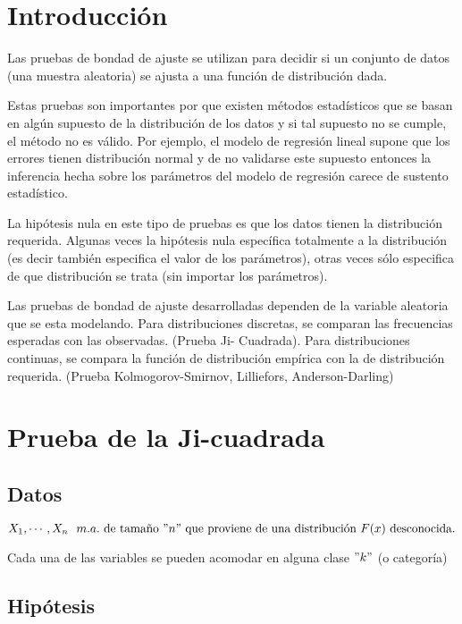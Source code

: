 \documentclass[
  a4paper,
  oneside,
  openany]{book}
\begin{document}
\hypertarget{introducciuxf3n-4}{%
\chapter*{Introducción}\label{introducciuxf3n-4}}


Las pruebas de bondad de ajuste se utilizan para decidir si un conjunto de datos (una muestra aleatoria) se ajusta a una función de distribución dada.

Estas pruebas son importantes por que existen métodos estadísticos que se basan en algún supuesto de la distribución de los datos y si tal supuesto no se cumple, el método no es válido. Por ejemplo, el modelo de regresión lineal supone que los errores tienen distribución normal y de no validarse este supuesto entonces la inferencia hecha sobre los parámetros del modelo de regresión carece de sustento estadístico.

La hipótesis nula en este tipo de pruebas es que los datos tienen la distribución requerida. Algunas veces la hipótesis nula específica totalmente a la distribución (es decir también especifica el valor de los parámetros), otras veces sólo especifica de que distribución se trata (sin importar los parámetros).

Las pruebas de bondad de ajuste desarrolladas dependen de la variable aleatoria que se esta modelando. Para distribuciones discretas, se comparan las frecuencias esperadas con las observadas. (Prueba Ji-
Cuadrada). Para distribuciones continuas, se compara la función de distribución empírica con la de distribución requerida. (Prueba Kolmogorov-Smirnov, Lilliefors, Anderson-Darling)

\hypertarget{prueba-de-la-ji-cuadrada}{%
\chapter{Prueba de la Ji-cuadrada}\label{prueba-de-la-ji-cuadrada}}

\hypertarget{datos-14}{%
\section{Datos}\label{datos-14}}

\[X_{1},\cdots,X_{n} \ \ m.a. \  \mbox{de tamaño} \  "n"\  \mbox{que proviene de una distribución} \  F(x) \  \mbox{desconocida.}\]

Cada una de las variables se pueden acomodar en alguna clase \("k"\) (o categoría)

\hypertarget{hipuxf3tesis-13}{%
\section{Hipótesis}\label{hipuxf3tesis-13}}
\end{document}
